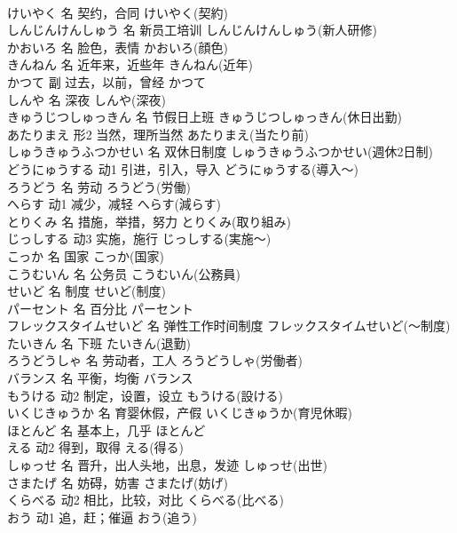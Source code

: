 \documentclass[8pt]{extreport}
\begin{document}
\begin{CJK}{UTF8}{min}
\\	けいやく	名	契约，合同	けいやく(契約)	
\\	しんじんけんしゅう	名	新员工培训	しんじんけんしゅう(新人研修)	
\\	かおいろ	名	脸色，表情	かおいろ(顔色)	
\\	きんねん	名	近年来，近些年	きんねん(近年)	
\\	かつて	副	过去，以前，曾经	かつて	
\\	しんや	名	深夜	しんや(深夜)	
\\	きゅうじつしゅっきん	名	节假日上班	きゅうじつしゅっきん(休日出勤)	
\\	あたりまえ	形2	当然，理所当然	あたりまえ(当たり前)	
\\	しゅうきゅうふつかせい	名	双休日制度	しゅうきゅうふつかせい(週休2日制)	
\\	どうにゅうする	动1	引进，引入，导入	どうにゅうする(導入～)	
\\	ろうどう	名	劳动	ろうどう(労働)	
\\	へらす	动1	减少，减轻	へらす(減らす)	
\\	とりくみ	名	措施，举措，努力	とりくみ(取り組み)	
\\	じっしする	动3	实施，施行	じっしする(実施～)	
\\	こっか	名	国家	こっか(国家)	
\\	こうむいん	名	公务员	こうむいん(公務員)	
\\	せいど	名	制度	せいど(制度)	
\\	パーセント	名	百分比	パーセント
\\	フレックスタイムせいど	名	弹性工作时间制度	フレックスタイムせいど(～制度)	
\\	たいきん	名	下班	たいきん(退勤)	
\\	ろうどうしゃ	名	劳动者，工人	ろうどうしゃ(労働者)	
\\	バランス	名	平衡，均衡	バランス	
\\	もうける	动2	制定，设置，设立	もうける(設ける)	
\\	いくじきゅうか	名	育婴休假，产假	いくじきゅうか(育児休暇)	
\\	ほとんど	名	基本上，几乎	ほとんど	
\\	える	动2	得到，取得	える(得る)	
\\	しゅっせ	名	晋升，出人头地，出息，发迹	しゅっせ(出世)	
\\	さまたげ	名	妨碍，妨害	さまたげ(妨げ)	
\\	くらべる	动2	相比，比较，对比	くらべる(比べる)	
\\	おう	动1	追，赶；催逼	おう(追う)	

\end{CJK}
\end{document}
